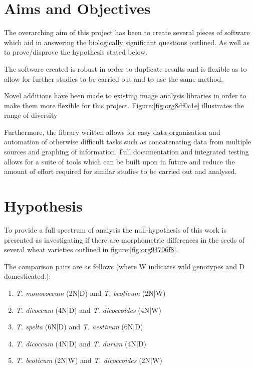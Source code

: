 \documentclass[11pt]{report}
\begin{document}
\section{Aims and Objectives}
\label{sec:org91a3814}

The overarching aim of this project has been to create several pieces of software which aid in answering the biologically significant questions outlined. As well as to prove/disprove the hypothesis stated below.

The software created is robust in order to duplicate results and is flexible as to allow for further studies to be carried out and to use the same method.

Novel additions have been made to existing image analysis libraries in order to make them more flexible for this project. Figure:\ref{fig:org8df0c1e} illustrates the range of diversity

Furthermore, the library written allows for easy data organisation and automation of otherwise difficult tasks such as concatenating data from multiple sources and graphing of information. Full documentation and integrated testing allows for a suite of tools which can be built upon in future and reduce the amount of effort required for similar studies to be carried out and analysed.

\section{Hypothesis}
\label{sec:org5baf6b4}
To provide a full spectrum of analysis the null-hypothesis of this work is presented as investigating if there are morphometric differences in the seeds of several wheat varieties outlined in figure:\ref{fig:org94706f8}.

The comparison pairs are as follows (where W indicates wild genotypes and D domesticated.):

\begin{enumerate}
\item \emph{T. monococcum} (2N|D) and \emph{T. beoticum} (2N|W)
\item \emph{T. dicoccum} (4N|D) and \emph{T. dicoccoides} (4N|W)
\item \emph{T. spelta} (6N|D) and \emph{T. aestivum} (6N|D)
\item \emph{T. dicoccum} (4N|D) and \emph{T. durum} (4N|D)
\item \emph{T. beoticum} (2N|W) and \emph{T. dicoccoides} (2N|W)
\end{enumerate}
\end{document}
